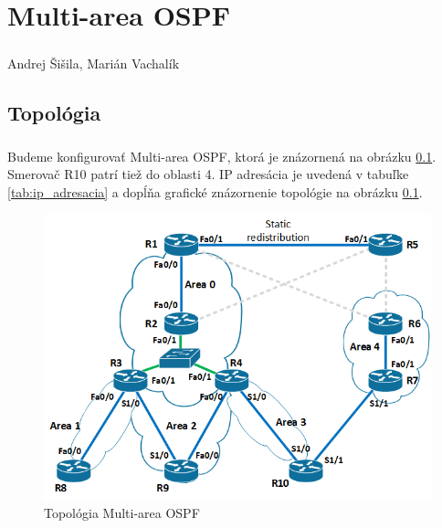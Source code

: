 \documentclass[12pt,twoside,a4paper]{report}
\begin{document}

\setcounter{chapter}{1}
\chapter*{Multi-area OSPF}
\paragraph{}
Andrej Šišila, Marián Vachalík

\tableofcontents

\newpage
\section{Topológia}
\paragraph{}
Budeme konfigurovať Multi-area OSPF, ktorá je znázornená na obrázku \ref{fig:multiarea_ospf_topo}. Smerovač R10 patrí tiež do oblasti 4. IP adresácia je uvedená v tabuľke \ref{tab:ip_adresacia} a dopĺňa grafické znázornenie topológie na obrázku \ref{fig:multiarea_ospf_topo}.

\begin{figure}[!htb]
\centering
\includegraphics[width=12cm,keepaspectratio]{multiarea_ospf_topo}
\caption{Topológia Multi-area OSPF}
\label{fig:multiarea_ospf_topo}
\end{figure}
\end{document}
